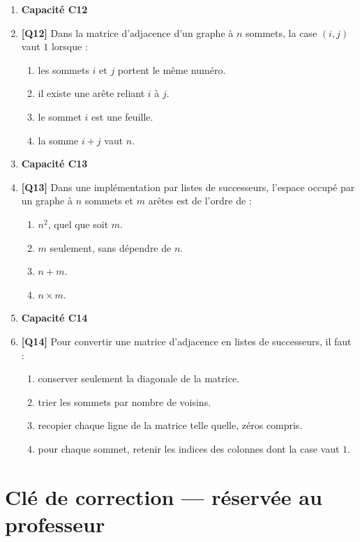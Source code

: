 \begin{enumerate}
\item[] \textbf{Capacité C12}

\item \textbf{[Q12]} Dans la matrice d'adjacence d'un graphe à $n$ sommets, la case $(i, j)$ vaut $1$ lorsque :
  \begin{enumerate}[label=\Alph*.]
    \item les sommets $i$ et $j$ portent le même numéro.
    \item il existe une arête reliant $i$ à $j$.
    \item le sommet $i$ est une feuille.
    \item la somme $i + j$ vaut $n$.
  \end{enumerate}

\item[] \textbf{Capacité C13}

\item \textbf{[Q13]} Dans une implémentation par listes de successeurs, l'espace occupé par un graphe à $n$ sommets et $m$ arêtes est de l'ordre de :
  \begin{enumerate}[label=\Alph*.]
    \item $n^2$, quel que soit $m$.
    \item $m$ seulement, sans dépendre de $n$.
    \item $n + m$.
    \item $n \times m$.
  \end{enumerate}

\item[] \textbf{Capacité C14}

\item \textbf{[Q14]} Pour convertir une matrice d'adjacence en listes de successeurs, il faut :
  \begin{enumerate}[label=\Alph*.]
    \item conserver seulement la diagonale de la matrice.
    \item trier les sommets par nombre de voisins.
    \item recopier chaque ligne de la matrice telle quelle, zéros compris.
    \item pour chaque sommet, retenir les indices des colonnes dont la case vaut $1$.
  \end{enumerate}

\end{enumerate}

\ifnxVersionProfesseur
\clearpage
\section*{Clé de correction — réservée au professeur}

